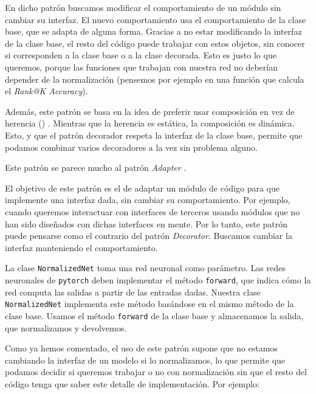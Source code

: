 En dicho patrón buscamos modificar el comportamiento de un módulo sin cambiar su interfaz. El nuevo comportamiento usa el comportamiento de la clase base, que se adapta de alguna forma. Gracias a no estar modificando la interfaz de la clase base, el resto del código puede trabajar con estos objetos, sin conocer si corresponden a la clase base o a la clase decorada. Esto es justo lo que queremos, porque las funciones que trabajan con nuestra red no deberían depender de la normalización (pensemos por ejemplo en una función que calcula el \textit{Rank@K Accuracy}).

Además, este patrón se basa en la idea de preferir usar composición en vez de herencia () \cite{informatica:comp_over_inh}. Mientras que la herencia es estática, la composición es dinámica. Esto, y que el patrón decorador respeta la interfaz de la clase base, permite que podamos combinar varios decoradores a la vez sin problema alguno.

\begin{observacion}

	Este patrón se parece mucho al patrón \textit{Adapter} \cite{informatica:design_patterns} \cite{informatica:adapter_pattern}.

	El objetivo de este patrón es el de adaptar un módulo de código para que implemente una interfaz dada, sin cambiar su comportamiento. Por ejemplo, cuando queremos interactuar con interfaces de terceros usando módulos que no han sido diseñados con dichas interfaces en mente. Por lo tanto, este patrón puede pensarse como el contrario del patrón \textit{Decorator}. Buscamos cambiar la interfaz manteniendo el comportamiento.

\end{observacion}

La clase \lstinline{NormalizedNet} toma una red neuronal como parámetro. Las redes neuronales de \lstinline{pytorch} deben implementar el método \lstinline{forward}, que indica cómo la red computa las salidas a partir de las entradas dadas. Nuestra clase \lstinline{NormalizedNet} implementa este método basándose en el mismo método de la clase base. Usamos el método \lstinline{forward} de la clase base y almacenamos la salida, que normalizamos y devolvemos.

Como ya hemos comentado, el uso de este patrón supone que no estamos cambiando la interfaz de un modelo si lo normalizamos, lo que permite que podamos decidir si queremos trabajar o no con normalización sin que el resto del código tenga que saber este detalle de implementación. Por ejemplo:

